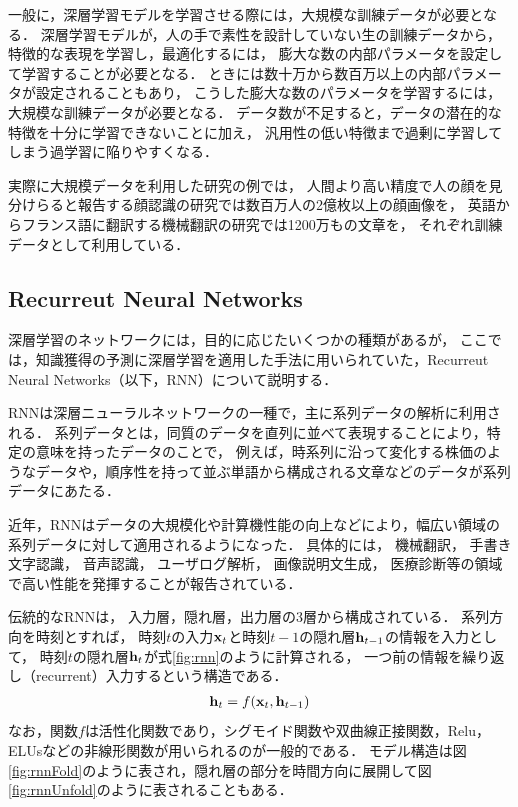 一般に，深層学習モデルを学習させる際には，大規模な訓練データが必要となる．
深層学習モデルが，人の手で素性を設計していない生の訓練データから，特徴的な表現を学習し，最適化するには，
膨大な数の内部パラメータを設定して学習することが必要となる．
ときには数十万から数百万以上の内部パラメータが設定されることもあり，
こうした膨大な数のパラメータを学習するには，大規模な訓練データが必要となる．
データ数が不足すると，データの潜在的な特徴を十分に学習できないことに加え，
汎用性の低い特徴まで過剰に学習してしまう過学習に陥りやすくなる\cite{tetko1995neural}．

実際に大規模データを利用した研究の例では，
人間より高い精度で人の顔を見分けらると報告する顔認識の研究\cite{schroff2015facenet}では数百万人の2億枚以上の顔画像を，
英語からフランス語に翻訳する機械翻訳の研究\cite{xu2015show}では1200万もの文章を，
それぞれ訓練データとして利用している．



\subsection{Recurreut Neural Networks}
深層学習のネットワークには，目的に応じたいくつかの種類があるが，
ここでは，知識獲得の予測に深層学習を適用した手法\cite{piech2015deep}に用いられていた，Recurreut Neural Networks\cite{williams1989learning}（以下，RNN）について説明する．


RNNは深層ニューラルネットワークの一種で，主に系列データの解析に利用される．
系列データとは，同質のデータを直列に並べて表現することにより，特定の意味を持ったデータのことで，
例えば，時系列に沿って変化する株価のようなデータや，順序性を持って並ぶ単語から構成される文章などのデータが系列データにあたる．

近年，RNNはデータの大規模化や計算機性能の向上などにより，幅広い領域の系列データに対して適用されるようになった．
具体的には，
機械翻訳\cite{sutskever2014sequence, dong2015multi}，
手書き文字認識\cite{graves2009offline,louradour2014curriculum}，
音声認識\cite{hinton2012deep,bahdanau2015end}，
ユーザログ解析\cite{hidasi2015session}，
画像説明文生成\cite{xu2015show,vinyals2014show}，
医療診断\cite{choi2015doctor,lipton2015learning}等の領域で高い性能を発揮することが報告されている．

伝統的なRNNは，
入力層，隠れ層，出力層の3層から構成されている．
系列方向を時刻とすれば，
時刻$t$の入力${\bf x}_t$と時刻$t-1$の隠れ層${\bf h}_{t-1}$の情報を入力として，
時刻$t$の隠れ層${\bf h}_t$が式\ref{fig:rnn}のように計算される，
一つ前の情報を繰り返し（recurrent）入力するという構造である．
\begin{eqnarray}
\label{fig:rnn}
{\bf h}_t = f({\bf x}_t, {\bf h}_{t-1})
\end{eqnarray}
なお，関数$f$は活性化関数であり，シグモイド関数や双曲線正接関数，Relu\cite{nair2010rectified}，ELUs\cite{clevert2015fast}などの非線形関数が用いられるのが一般的である．
モデル構造は図\ref{fig:rnnFold}のように表され，隠れ層の部分を時間方向に展開して図\ref{fig:rnnUnfold}のように表されることもある．

